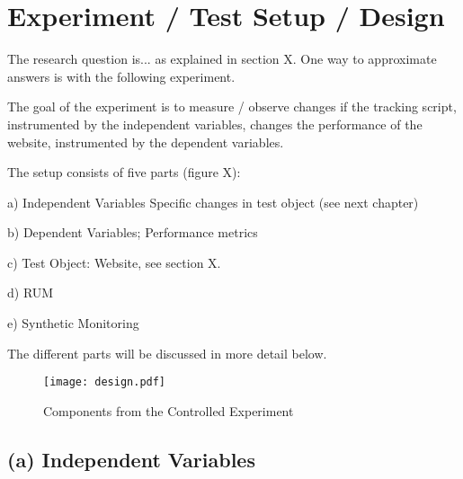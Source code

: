 





\section{Experiment / Test Setup / Design}


The research question is... as explained in section X.
One way to approximate answers is with the following experiment.



The goal of the experiment is to measure / observe changes if the tracking script, instrumented by the independent variables, changes the performance of the website, instrumented by the dependent variables.

The setup consists of five parts (figure X):

a) Independent Variables Specific changes in test object (see next chapter)

b) Dependent Variables; Performance metrics

c) Test Object: Website, see section X.

d) RUM

e) Synthetic Monitoring

The different parts will be discussed in more detail below.

\begin{figure}[h!]
\begin{center}
\texttt{[image: design.pdf]}
\caption{Components from the Controlled Experiment}
\label{figure:design_setup}
\end{center}
\end{figure}






\subsection{(a) Independent Variables}

